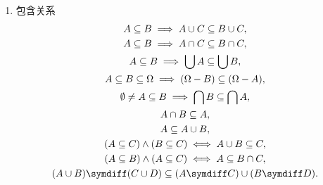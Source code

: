 \begin{property}
\begin{enumerate}
\item 包含关系
\begin{gather}
	A \subseteq B \implies A \cup C \subseteq B \cup C, \label{equation:集合论.集合代数公式6-1} \\
	A \subseteq B \implies A \cap C \subseteq B \cap C, \label{equation:集合论.集合代数公式6-2} \\
	A \subseteq B \implies \bigcup A \subseteq \bigcup B, \label{equation:集合论.集合代数公式6-3} \\
	A \subseteq B \subseteq \Omega \implies (\Omega - B) \subseteq (\Omega - A), \label{equation:集合论.集合代数公式6-4} \\
	\emptyset \neq A \subseteq B \implies \bigcap B \subseteq \bigcap A, \label{equation:集合论.集合代数公式6-5} \\
	A \cap B \subseteq A, \\
	A \subseteq A \cup B, \label{equation:集合论.集合代数公式6-7} \\
	(A \subseteq C) \land (B \subseteq C) \iff A \cup B \subseteq C, \label{equation:集合论.集合代数公式6-8} \\
	(A \subseteq B) \land (A \subseteq C) \iff A \subseteq B \cap C, \label{equation:集合论.集合代数公式6-9} \\
	(A \cup B) \symdiff (C \cup D) \subseteq (A \symdiff C) \cup (B \symdiff D).
\end{gather}


\end{enumerate}
\end{property}
